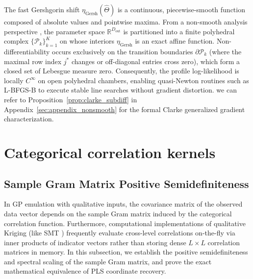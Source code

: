 \documentclass[default,sn-mathphys,Numbered]{sn-jnl}
\theoremstyle{thmstyleone}
\theoremstyle{thmstylethree}
\theoremstyle{thmstyletwo}
\newcommand{\outp}{\text{out}}
\begin{document}
The fast Gershgorin shift $\eta_{\mathrm{Gersh}}(\hat{\Theta})$ is a continuous, piecewise-smooth function composed of absolute values and pointwise maxima. From a non-smooth analysis perspective \citep{clarke1990optimization}, the parameter space $\mathbb{R}^{D_{\outp}}$ is partitioned into a finite polyhedral complex $\{\mathcal{P}_k\}_{k=1}^K$ on whose interiors $\eta_{\mathrm{Gersh}}$ is an exact affine function. Non-differentiability occurs exclusively on the transition boundaries $\partial \mathcal{P}_k$ (where the maximal row index $j^*$ changes or off-diagonal entries cross zero), which form a closed set of Lebesgue measure zero. Consequently, the profile log-likelihood is locally $C^\infty$ on open polyhedral chambers, enabling quasi-Newton routines such as L-BFGS-B to execute stable line searches without gradient distortion. we can refer to Proposition~\ref{prop:clarke_subdiff} in Appendix~\ref{sec:appendix_nonsmooth} for the formal Clarke generalized gradient characterization.


\section{Categorical correlation kernels}
\label{sec:kernels}

\subsection{Sample Gram Matrix Positive Semidefiniteness}
\label{subsec:gram_matrix_recovery}

In GP emulation with qualitative inputs, the covariance matrix of the observed data vector depends on the sample Gram matrix induced by the categorical correlation function. Furthermore, computational implementations of qualitative Kriging (like SMT \citep{saves2023smt}) frequently evaluate cross-level correlations on-the-fly via inner products of indicator vectors rather than storing dense $L \times L$ correlation matrices in memory. In this subsection, we establish the positive semidefiniteness and spectral scaling of the sample Gram matrix, and prove the exact mathematical equivalence of PLS coordinate recovery.
\end{document}
